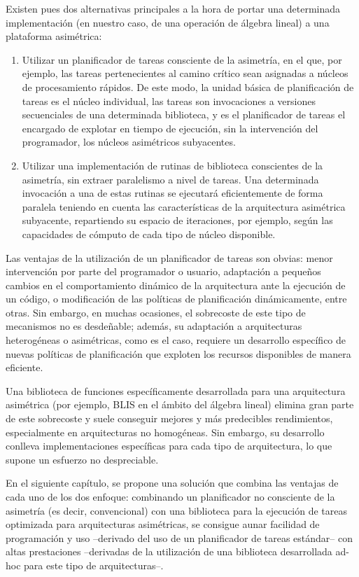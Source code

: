 Existen pues dos alternativas principales a la hora de portar una determinada implementación (en nuestro caso, de una operación
de álgebra lineal) a una plataforma asimétrica:

\begin{enumerate}
 \item Utilizar un planificador de tareas consciente de la asimetría, en el que, por ejemplo, las tareas pertenecientes al camino crítico 
	 sean asignadas a núcleos de procesamiento rápidos. De este modo, la unidad básica de planificación de tareas es el núcleo individual,
		las tareas son invocaciones a versiones secuenciales de una determinada biblioteca, 
		y es el planificador de tareas el encargado de explotar en tiempo de ejecución, sin la intervención del programador, los
		núcleos asimétricos subyacentes.
		
	\item Utilizar una implementación de rutinas de biblioteca conscientes de la asimetría, sin extraer paralelismo a nivel de tareas. Una
		determinada invocación a una de estas rutinas se ejecutará eficientemente de forma paralela teniendo en cuenta las 
		características de la arquitectura asimétrica subyacente, repartiendo su espacio de iteraciones, por ejemplo, según las
		capacidades de cómputo de cada tipo de núcleo disponible.
\end{enumerate}

Las ventajas de la utilización de un planificador de tareas son obvias: menor intervención por parte del programador o usuario,
adaptación a pequeños cambios en el comportamiento dinámico de la arquitectura ante la ejecución de un código, o modificación
de las políticas de planificación dinámicamente, entre otras. Sin embargo, en muchas ocasiones, el sobrecoste de este tipo de
mecanismos no es desdeñable; además, su adaptación a arquitecturas heterogéneas o asimétricas, como es el caso, requiere
un desarrollo específico de nuevas políticas de planificación que exploten los recursos disponibles de manera eficiente.

Una biblioteca de funciones específicamente desarrollada para una arquitectura asimétrica (por ejemplo, BLIS en el ámbito del álgebra lineal) elimina gran parte
de este sobrecoste y suele conseguir mejores y más predecibles rendimientos, especialmente en arquitecturas no homogéneas. Sin
embargo, su desarrollo conlleva implementaciones específicas para cada tipo de arquitectura, lo que supone un esfuerzo no despreciable.

En el siguiente capítulo, se propone una solución que combina las ventajas de cada uno de los dos enfoque: combinando un planificador
no consciente de la asimetría (es decir, convencional) con una biblioteca para la ejecución de tareas optimizada para arquitecturas
asimétricas, se consigue aunar facilidad de programación y uso --derivado del uso de un planificador de tareas estándar-- con altas
prestaciones --derivadas de la utilización de una biblioteca desarrollada ad-hoc para este tipo de arquitecturas--.

